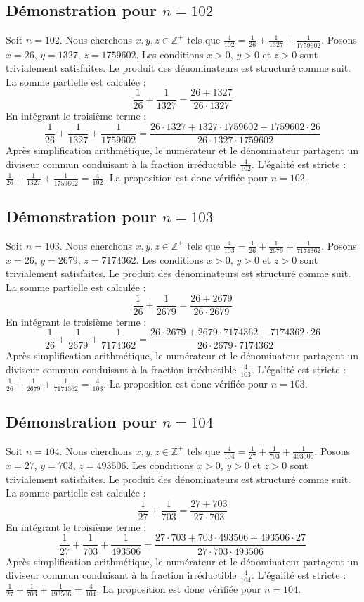 \documentclass[11pt,a4paper]{article}
\begin{document}
\subsection{Démonstration pour $n = 102$}
Soit $n = 102$. Nous cherchons $x, y, z \in \mathbb{Z}^{+}$ tels que $\frac{4}{102} = \frac{1}{26} + \frac{1}{1327} + \frac{1}{1759602}$.
Posons $x = 26$, $y = 1327$, $z = 1759602$.
Les conditions $x > 0$, $y > 0$ et $z > 0$ sont trivialement satisfaites.
Le produit des dénominateurs est structuré comme suit. La somme partielle est calculée :
$$ \frac{1}{26} + \frac{1}{1327} = \frac{26+1327}{26 \cdot 1327} $$
En intégrant le troisième terme :
$$ \frac{1}{26} + \frac{1}{1327} + \frac{1}{1759602} = \frac{26 \cdot 1327 + 1327 \cdot 1759602 + 1759602 \cdot 26}{26 \cdot 1327 \cdot 1759602} $$
Après simplification arithmétique, le numérateur et le dénominateur partagent un diviseur commun conduisant à la fraction irréductible $\frac{4}{102}$.
L'égalité est stricte : $\frac{1}{26} + \frac{1}{1327} + \frac{1}{1759602} = \frac{4}{102}$.
La proposition est donc vérifiée pour $n = 102$.
\subsection{Démonstration pour $n = 103$}
Soit $n = 103$. Nous cherchons $x, y, z \in \mathbb{Z}^{+}$ tels que $\frac{4}{103} = \frac{1}{26} + \frac{1}{2679} + \frac{1}{7174362}$.
Posons $x = 26$, $y = 2679$, $z = 7174362$.
Les conditions $x > 0$, $y > 0$ et $z > 0$ sont trivialement satisfaites.
Le produit des dénominateurs est structuré comme suit. La somme partielle est calculée :
$$ \frac{1}{26} + \frac{1}{2679} = \frac{26+2679}{26 \cdot 2679} $$
En intégrant le troisième terme :
$$ \frac{1}{26} + \frac{1}{2679} + \frac{1}{7174362} = \frac{26 \cdot 2679 + 2679 \cdot 7174362 + 7174362 \cdot 26}{26 \cdot 2679 \cdot 7174362} $$
Après simplification arithmétique, le numérateur et le dénominateur partagent un diviseur commun conduisant à la fraction irréductible $\frac{4}{103}$.
L'égalité est stricte : $\frac{1}{26} + \frac{1}{2679} + \frac{1}{7174362} = \frac{4}{103}$.
La proposition est donc vérifiée pour $n = 103$.
\subsection{Démonstration pour $n = 104$}
Soit $n = 104$. Nous cherchons $x, y, z \in \mathbb{Z}^{+}$ tels que $\frac{4}{104} = \frac{1}{27} + \frac{1}{703} + \frac{1}{493506}$.
Posons $x = 27$, $y = 703$, $z = 493506$.
Les conditions $x > 0$, $y > 0$ et $z > 0$ sont trivialement satisfaites.
Le produit des dénominateurs est structuré comme suit. La somme partielle est calculée :
$$ \frac{1}{27} + \frac{1}{703} = \frac{27+703}{27 \cdot 703} $$
En intégrant le troisième terme :
$$ \frac{1}{27} + \frac{1}{703} + \frac{1}{493506} = \frac{27 \cdot 703 + 703 \cdot 493506 + 493506 \cdot 27}{27 \cdot 703 \cdot 493506} $$
Après simplification arithmétique, le numérateur et le dénominateur partagent un diviseur commun conduisant à la fraction irréductible $\frac{4}{104}$.
L'égalité est stricte : $\frac{1}{27} + \frac{1}{703} + \frac{1}{493506} = \frac{4}{104}$.
La proposition est donc vérifiée pour $n = 104$.
\end{document}
